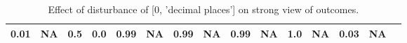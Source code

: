 \begin{table}
\begin{tabular}{l|cc|cc|cc|cc|cc|cc|cc}
\cellcolor{Bittersweet}0.01&\cellcolor{Bittersweet}NA&\cellcolor{Bittersweet}0.5&\cellcolor{Bittersweet}0.0&\cellcolor{Bittersweet}0.99&\cellcolor{Bittersweet}NA&\cellcolor{Bittersweet}0.99&\cellcolor{Bittersweet}NA&\cellcolor{Bittersweet}0.99&\cellcolor{Bittersweet}NA&\cellcolor{Bittersweet}1.0&\cellcolor{Bittersweet}NA&\cellcolor{Bittersweet}0.03&\cellcolor{Bittersweet}NA\\\bottomrule\end{tabular}\caption{Effect of disturbance of [0, 'decimal places'] on strong view of outcomes.}\end{table}